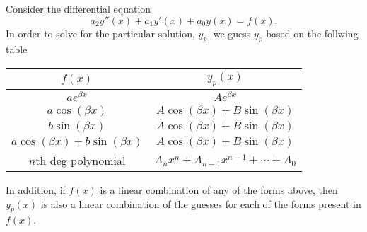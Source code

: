 \begin{theorem}
    Consider the differential equation
    $$a_2y''(x)+a_1y'(x)+a_0y(x) = f(x).$$
    In order to solve for the particular solution, $y_p$, we guess $y_p$
    based on the follwing table
    \begin{center}
        \begin{tabular}{|c|c|}
        \hline
        $f(x)$ & $y_p(x)$ \\
        \hline
        $ae^{\beta x}$ & $Ae^{\beta x}$ \\
        $a\cos(\beta x)$ & $A\cos(\beta x)+B\sin(\beta x)$ \\
        $b\sin(\beta x)$ & $A\cos(\beta x)+B\sin(\beta x)$ \\
        $a\cos(\beta x)+b\sin(\beta x)$ & $A\cos(\beta x)+B\sin(\beta x)$ \\
        $n$th deg polynomial & $A_nx^n+A_{n-1}x^{n-1}+\cdots+A_0$ \\
        \hline
        \end{tabular}
    \end{center}
    In addition, if $f(x)$ is a linear combination of any of the forms
    above, then $y_p(x)$ is also a linear combination of the guesses for
    each of the forms present in $f(x)$.
\end{theorem}

